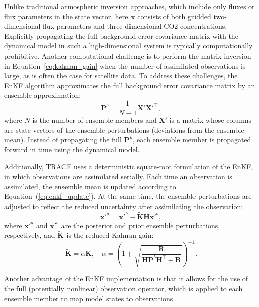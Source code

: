 \documentclass[a4,12pt]{article}
\begin{document}
Unlike traditional atmospheric inversion approaches,
which include only fluxes or flux parameters in the state vector,
here $\mathbf{x}$ consists of both gridded two-dimensional flux parameters and three-dimensional CO2 concentrations.
Explicitly propagating the full background error covariance matrix with the dynamical model in such a high-dimensional system is typically computationally prohibitive.
Another computational challenge is to perform the matrix inversion in Equation~\ref{eq:kalman_gain} when the number of assimilated observations is large,
as is often the case for satellite data.
To address these challenges,
the EnKF algorithm approximates the full background error covariance matrix by an ensemble approximation:
\begin{equation}
    \label{eq:ensemble}
    \mathbf{P}^b = \frac{1}{N - 1} \mathbf{X}' \mathbf{X}'^\top,
\end{equation}
where $N$ is the number of ensemble members
and $\mathbf{X}'$ is a matrix whose columns are state vectors of the ensemble perturbations (deviations from the ensemble mean).
Instead of propagating the full $\mathbf{P}^b$,
each ensemble member is propagated forward in time using the dynamical model.

Additionally,
TRACE uses a deterministic square-root formulation of the EnKF,
in which observations are assimilated serially.
Each time an observation is assimilated,
the ensemble mean is updated according to Equation~(\ref{eq:enkf_update}).
At the same time,
the ensemble perturbations are adjusted to reflect the reduced uncertainty after assimilating the observation:
\begin{equation}
    \label{eq:mem_update}
    \mathbf{x}'^a = \mathbf{x}'^b - \widetilde{\mathbf{K}}\mathbf{H}\mathbf{x}'^b,
\end{equation}
where $\mathbf{x}'^a$ and $\mathbf{x}'^b$ are the posterior and prior ensemble perturbations,
respectively,
and $\widetilde{\mathbf{K}}$ is the reduced Kalman gain:
\begin{equation}
    \label{eq:reduced_kalman_gain}
    \widetilde{\mathbf{K}} = \alpha\mathbf{K}, \quad
    \alpha = \left(1 + \sqrt{\frac{\mathbf{R}}{\mathbf{H}\mathbf{P}^b\mathbf{H}^\top + \mathbf{R}}} \right)^{-1}.
\end{equation}

Another advantage of the EnKF implementation is that it allows for the use of the full (potentially nonlinear) observation operator,
which is applied to each ensemble member to map model states to observations.
\end{document}
